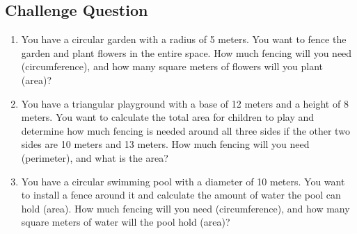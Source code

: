 \subsection{Challenge Question}
\begin{enumerate}[label=(\alph*)]
    \item You have a circular garden with a radius of 5 meters. You want to fence the garden and plant flowers in the entire space. How much fencing will you need (circumference), and how many square meters of flowers will you plant (area)?


    \item You have a triangular playground with a base of 12 meters and a height of 8 meters. You want to calculate the total area for children to play and determine how much fencing is needed around all three sides if the other two sides are 10 meters and 13 meters. How much fencing will you need (perimeter), and what is the area?

    \pagebreak
    \item You have a circular swimming pool with a diameter of 10 meters. You want to install a fence around it and calculate the amount of water the pool can hold (area). How much fencing will you need (circumference), and how many square meters of water will the pool hold (area)?
  


\end{enumerate}
